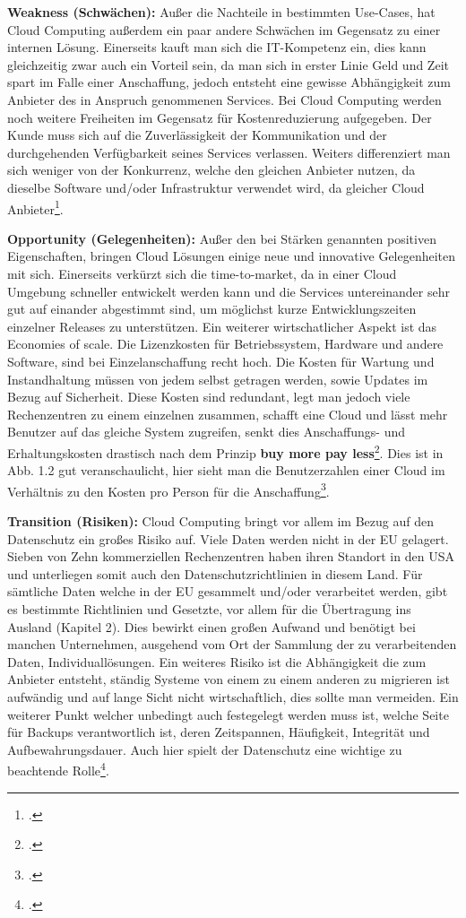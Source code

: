 \textbf{Weakness (Schwächen):} Außer die Nachteile in bestimmten Use-Cases, hat Cloud Computing außerdem ein paar andere Schwächen im Gegensatz zu einer internen Lösung. Einerseits kauft man sich die IT-Kompetenz ein, dies kann gleichzeitig zwar auch ein Vorteil sein, da man sich in erster 
Linie Geld und Zeit spart im Falle einer Anschaffung, jedoch entsteht eine gewisse Abhängigkeit zum Anbieter des in Anspruch genommenen Services. Bei Cloud Computing werden noch weitere Freiheiten im Gegensatz für Kostenreduzierung aufgegeben. Der Kunde muss sich auf die Zuverlässigkeit der
Kommunikation und der durchgehenden Verfügbarkeit seines Services verlassen. Weiters differenziert man sich weniger von der Konkurrenz, welche den gleichen Anbieter nutzen, da dieselbe Software und/oder Infrastruktur verwendet wird, da gleicher Cloud Anbieter\footcite{Lehrunterlagen-HTL-cloud}.

\textbf{Opportunity (Gelegenheiten):} Außer den bei Stärken genannten positiven Eigenschaften, bringen Cloud Lösungen einige neue und innovative Gelegenheiten mit sich. Einerseits verkürzt sich die time-to-market, da in einer Cloud Umgebung schneller entwickelt werden kann und die Services
untereinander sehr gut auf einander abgestimmt sind, um möglichst kurze Entwicklungszeiten einzelner Releases zu unterstützen. Ein weiterer wirtschatlicher Aspekt ist das Economies of scale. Die Lizenzkosten für Betriebssystem, Hardware und andere Software, sind bei Einzelanschaffung recht hoch.
Die Kosten für Wartung und Instandhaltung müssen von jedem selbst getragen werden, sowie Updates im Bezug auf Sicherheit. Diese Kosten sind redundant, legt man jedoch viele Rechenzentren zu einem einzelnen zusammen, schafft eine Cloud und lässt mehr Benutzer auf das gleiche System zugreifen, senkt
dies Anschaffungs- und Erhaltungskosten drastisch nach dem Prinzip \textbf{buy more pay less}\footcite{eos}. Dies ist in Abb. 1.2 gut veranschaulicht, hier sieht man die Benutzerzahlen einer Cloud im Verhältnis zu den Kosten pro Person für die Anschaffung\footcite{Lehrunterlagen-HTL-cloud}.

\textbf{Transition (Risiken):} Cloud Computing bringt vor allem im Bezug auf den Datenschutz ein großes Risiko auf. Viele Daten werden nicht in der EU gelagert. Sieben von Zehn kommerziellen Rechenzentren haben ihren Standort in den USA und unterliegen somit auch den Datenschutzrichtlinien in diesem
Land. Für sämtliche Daten welche in der EU gesammelt und/oder verarbeitet werden, gibt es bestimmte Richtlinien und Gesetzte, vor allem für die Übertragung ins Ausland (Kapitel 2). Dies bewirkt einen großen Aufwand und benötigt bei manchen Unternehmen, ausgehend vom Ort der Sammlung der zu verarbeitenden Daten,
Individuallösungen. Ein weiteres Risiko ist die Abhängigkeit die zum Anbieter entsteht, ständig Systeme von einem zu einem anderen zu migrieren ist aufwändig und auf lange Sicht nicht wirtschaftlich, dies sollte man vermeiden. Ein weiterer Punkt welcher unbedingt auch festegelegt werden muss ist, welche Seite
für Backups verantwortlich ist, deren Zeitspannen, Häufigkeit, Integrität und Aufbewahrungsdauer. Auch hier spielt der Datenschutz eine wichtige zu beachtende Rolle\footcite{Lehrunterlagen-HTL-cloud}.

